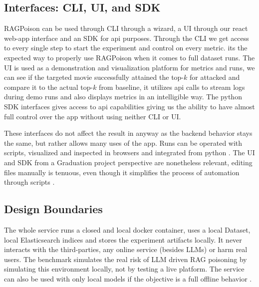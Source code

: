 \subsection{Interfaces: CLI, UI, and SDK}

RAGPoison can be used through CLI through a wizard, a UI through our react web-app interface and an SDK for api purposes. Through the CLI we get access to every single step to start the experiment and control on every metric. its the expected way to properly use RAGPoison when it comes to full dataset runs. The UI is used as a demonstration and visualization platform for metrics and runs, we can see if the targeted movie successfully attained the top-$k$ for attacked and compare it to the actual top-$k$ from baseline, it utilizes api calls to stream logs during demo runs and also displays metrics in an intelligible way. The python SDK interfaces gives access to api capabilities giving us the ability to have almost full control over the app without using neither CLI or UI.

These interfaces do not affect the result in anyway as the backend behavior stays the same, but rather allows many uses of the app. Runs can be operated with scripts, visualized and inspected in browsers and integrated from python \cite{ragpoisonlab_repo}. The UI and SDK from a Graduation project perspective are nonetheless relevant, editing files manually is tenuous, even though it simplifies the process of automation through scripts \cite{ragpoisonlab_repo}. 

\subsection{Design Boundaries}

The whole service runs a closed and local docker container, uses a local Dataset, local Elasticsearch indices and stores the experiment artifacts locally. It never interacts with the third-parties, any online service (besides LLMs) or harm real users. The benchmark simulates the real risk of LLM driven RAG poisoning by simulating this environment locally, not by testing a live platform. The service can also be used with only local models if the objective is a full offline behavior \cite{ragpoisonlab_repo,perez2022redteaming}.
